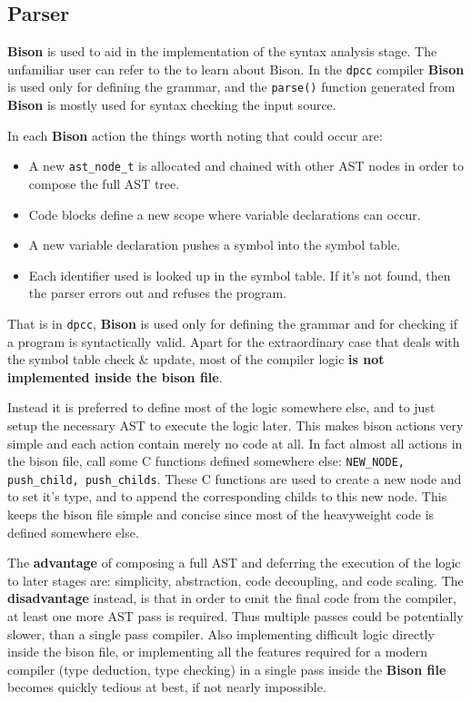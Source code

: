 \documentclass[a4paper]{article}
\newcommand{\urlref}[3][blue]{\href{#2}{\color{#1}{#3}}}%
\begin{document}
\subsection{Parser}

\textbf{Bison} is used to aid in the implementation of the syntax analysis stage.
The unfamiliar user can refer to the \urlref{https://www.gnu.org/software/bison/manual/bison.html}{manual} to learn
about Bison. In the \texttt{dpcc} compiler \textbf{Bison} is used only for defining the grammar, and
the \texttt{parse()} function generated from \textbf{Bison} is mostly used for syntax checking the input source.

In each \textbf{Bison} action the things worth noting that could occur are:
\begin{itemize}
\item A new \texttt{ast\_node\_t} is allocated and chained with other AST nodes in order to compose the full AST tree.
\item Code blocks define a new scope where variable declarations can occur.
\item A new variable declaration pushes a symbol into the symbol table.
\item Each identifier used is looked up in the symbol table. If it's not found, then the parser errors out and refuses the program.
\end{itemize}

That is in \texttt{dpcc}, \textbf{Bison} is used only for defining the grammar and for checking if a program is syntactically valid.
Apart for the extraordinary case that deals with the symbol table check \& update, most of the compiler logic \textbf{is not implemented inside the bison file}.

Instead it is preferred to define most of the logic somewhere else, and to just setup the necessary AST to
execute the logic later. This makes bison actions very simple and each action contain merely no code at all. In fact almost all actions
in the bison file, call some C functions defined somewhere else: \texttt{NEW\_NODE, push\_child, push\_childs}.
These C functions are used to create a new node and to set it's type, and to append the corresponding childs to this new node.
This keeps the bison file simple and concise since most of the heavyweight code is defined somewhere else.

The \textbf{advantage} of composing a full AST and deferring the execution of the logic to later stages are: simplicity, abstraction, code decoupling, and code scaling.
The \textbf{disadvantage} instead, is that in order to emit the final code from the compiler, at least one more AST pass is required. Thus multiple passes could be potentially slower, than a single
pass compiler. Also implementing difficult logic directly inside the bison file, or implementing all the features required for a modern
compiler (type deduction, type checking) in a single pass inside the \textbf{Bison file} becomes quickly tedious at best, if not nearly impossible.
\end{document}
